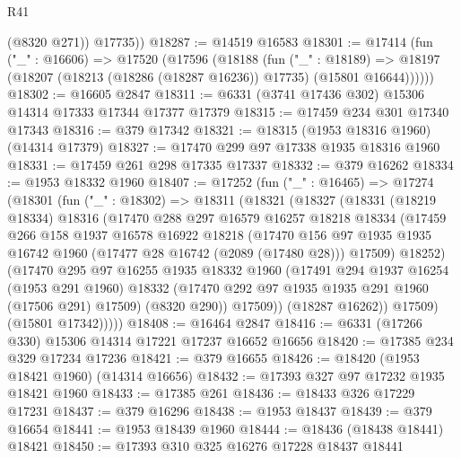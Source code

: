 \begin{lexlean}{R41}
\begin{coremodule}
          (@8320 @271))
        @17735))
@18287 := @14519 @16583
@18301 := @17414
    (fun ("_" : @16606) =>
    @17520
      (@17596
        (@18188
          (fun ("_" : @18189) =>
          @18197 (@18207 (@18213 (@18286 (@18287 @16236)) @17735) (@15801 @16644))))))
@18302 := @16605 @2847
@18311 := @6331 (@3741 @17436 @302) @15306 @14314 @17333 @17344 @17377 @17379
@18315 := @17459 @234 @301 @17340 @17343
@18316 := @379 @17342
@18321 := @18315 (@1953 @18316 @1960) (@14314 @17379)
@18327 := @17470 @299 @97 @17338 @1935 @18316 @1960
@18331 := @17459 @261 @298 @17335 @17337
@18332 := @379 @16262
@18334 := @1953 @18332 @1960
@18407 := @17252
    (fun ("_" : @16465) =>
    @17274
      (@18301
        (fun ("_" : @18302) =>
        @18311
          (@18321
            (@18327
              (@18331
                (@18219 @18334)
                @18316
                (@17470
                  @288
                  @297
                  @16579
                  @16257
                  @18218
                  @18334
                  (@17459
                    @266
                    @158
                    @1937
                    @16578
                    @16922
                    @18218
                    (@17470
                      @156
                      @97
                      @1935
                      @1935
                      @16742
                      @1960
                      (@17477 @28 @16742 (@2089 (@17480 @28)))
                      @17509)
                    @18252)
                  (@17470
                    @295
                    @97
                    @16255
                    @1935
                    @18332
                    @1960
                    (@17491
                      @294
                      @1937
                      @16254
                      (@1953 @291 @1960)
                      @18332
                      (@17470 @292 @97 @1935 @1935 @291 @1960 (@17506 @291) @17509)
                      (@8320 @290))
                    @17509))
                (@18287 @16262))
              @17509)
            (@15801 @17342)))))
@18408 := @16464 @2847
@18416 := @6331 (@17266 @330) @15306 @14314 @17221 @17237 @16652 @16656
@18420 := @17385 @234 @329 @17234 @17236
@18421 := @379 @16655
@18426 := @18420 (@1953 @18421 @1960) (@14314 @16656)
@18432 := @17393 @327 @97 @17232 @1935 @18421 @1960
@18433 := @17385 @261
@18436 := @18433 @326 @17229 @17231
@18437 := @379 @16296
@18438 := @1953 @18437
@18439 := @379 @16654
@18441 := @1953 @18439 @1960
@18444 := @18436 (@18438 @18441) @18421
@18450 := @17393 @310 @325 @16276 @17228 @18437 @18441

\end{coremodule}
\end{lexlean}
